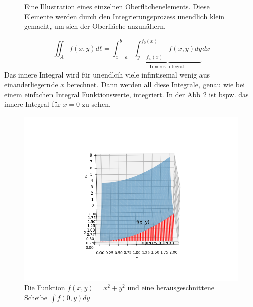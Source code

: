 \documentclass{report}
\begin{document}
{\begin{figure}[H]
        \caption{
            Eine Illustration eines einzelnen Oberflächenelements. Diese Elemente werden durch den Integrierungsprozess unendlich klein gemacht, um sich der Oberfläche anzunähern.}
        \label{fig:Doppelintegral}
        \end{figure}
        $$
        \iint_A f(x, y) d t=\int_{x=a}^b \underbrace{\int_{y=f_u(x)}^{f_0(x)} f(x, y) d y}_{\text {Inneres Integral }} d x
        $$
        Das innere Integral wird für unendlcih viele infintisemal wenig aus einanderliegernde $x$ berechnet.
        Dann werden all diese Integrale, genau wie bei einem einfachen Integral Funktionswerte, integriert.
        \newline
        In der Abb \ref*{fig:Doppelintegral_innere} ist bspw. das innere Integral für $x=0$ zu sehen.
    \begin{figure}[H]
        \centering
        \includegraphics*[scale=0.5]{Bilder/DoppelIntegralInnere.png}
        \caption{
            Die Funktion $f(x,y)=x^2+y^2$ und eine herausgeschnittene Scheibe $\int f(0,y)dy$}
        \label{fig:Doppelintegral_innere}
        \end{figure}        
}
\end{document}
